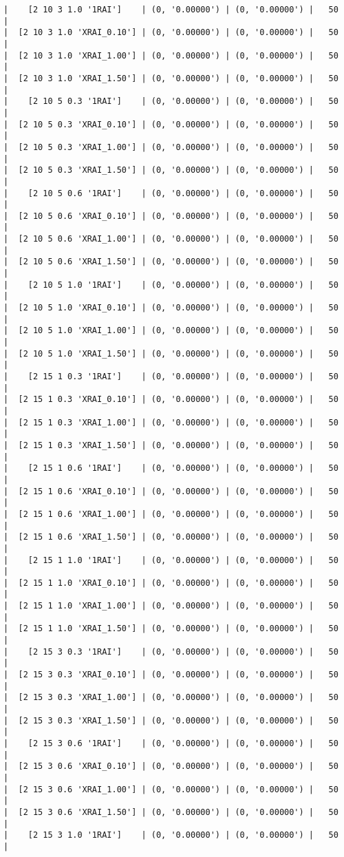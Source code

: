 \documentclass{article}
\begin{document}
\begin{verbatim}
|    [2 10 3 1.0 '1RAI']    | (0, '0.00000') | (0, '0.00000') |   50  |
|  [2 10 3 1.0 'XRAI_0.10'] | (0, '0.00000') | (0, '0.00000') |   50  |
|  [2 10 3 1.0 'XRAI_1.00'] | (0, '0.00000') | (0, '0.00000') |   50  |
|  [2 10 3 1.0 'XRAI_1.50'] | (0, '0.00000') | (0, '0.00000') |   50  |
|    [2 10 5 0.3 '1RAI']    | (0, '0.00000') | (0, '0.00000') |   50  |
|  [2 10 5 0.3 'XRAI_0.10'] | (0, '0.00000') | (0, '0.00000') |   50  |
|  [2 10 5 0.3 'XRAI_1.00'] | (0, '0.00000') | (0, '0.00000') |   50  |
|  [2 10 5 0.3 'XRAI_1.50'] | (0, '0.00000') | (0, '0.00000') |   50  |
|    [2 10 5 0.6 '1RAI']    | (0, '0.00000') | (0, '0.00000') |   50  |
|  [2 10 5 0.6 'XRAI_0.10'] | (0, '0.00000') | (0, '0.00000') |   50  |
|  [2 10 5 0.6 'XRAI_1.00'] | (0, '0.00000') | (0, '0.00000') |   50  |
|  [2 10 5 0.6 'XRAI_1.50'] | (0, '0.00000') | (0, '0.00000') |   50  |
|    [2 10 5 1.0 '1RAI']    | (0, '0.00000') | (0, '0.00000') |   50  |
|  [2 10 5 1.0 'XRAI_0.10'] | (0, '0.00000') | (0, '0.00000') |   50  |
|  [2 10 5 1.0 'XRAI_1.00'] | (0, '0.00000') | (0, '0.00000') |   50  |
|  [2 10 5 1.0 'XRAI_1.50'] | (0, '0.00000') | (0, '0.00000') |   50  |
|    [2 15 1 0.3 '1RAI']    | (0, '0.00000') | (0, '0.00000') |   50  |
|  [2 15 1 0.3 'XRAI_0.10'] | (0, '0.00000') | (0, '0.00000') |   50  |
|  [2 15 1 0.3 'XRAI_1.00'] | (0, '0.00000') | (0, '0.00000') |   50  |
|  [2 15 1 0.3 'XRAI_1.50'] | (0, '0.00000') | (0, '0.00000') |   50  |
|    [2 15 1 0.6 '1RAI']    | (0, '0.00000') | (0, '0.00000') |   50  |
|  [2 15 1 0.6 'XRAI_0.10'] | (0, '0.00000') | (0, '0.00000') |   50  |
|  [2 15 1 0.6 'XRAI_1.00'] | (0, '0.00000') | (0, '0.00000') |   50  |
|  [2 15 1 0.6 'XRAI_1.50'] | (0, '0.00000') | (0, '0.00000') |   50  |
|    [2 15 1 1.0 '1RAI']    | (0, '0.00000') | (0, '0.00000') |   50  |
|  [2 15 1 1.0 'XRAI_0.10'] | (0, '0.00000') | (0, '0.00000') |   50  |
|  [2 15 1 1.0 'XRAI_1.00'] | (0, '0.00000') | (0, '0.00000') |   50  |
|  [2 15 1 1.0 'XRAI_1.50'] | (0, '0.00000') | (0, '0.00000') |   50  |
|    [2 15 3 0.3 '1RAI']    | (0, '0.00000') | (0, '0.00000') |   50  |
|  [2 15 3 0.3 'XRAI_0.10'] | (0, '0.00000') | (0, '0.00000') |   50  |
|  [2 15 3 0.3 'XRAI_1.00'] | (0, '0.00000') | (0, '0.00000') |   50  |
|  [2 15 3 0.3 'XRAI_1.50'] | (0, '0.00000') | (0, '0.00000') |   50  |
|    [2 15 3 0.6 '1RAI']    | (0, '0.00000') | (0, '0.00000') |   50  |
|  [2 15 3 0.6 'XRAI_0.10'] | (0, '0.00000') | (0, '0.00000') |   50  |
|  [2 15 3 0.6 'XRAI_1.00'] | (0, '0.00000') | (0, '0.00000') |   50  |
|  [2 15 3 0.6 'XRAI_1.50'] | (0, '0.00000') | (0, '0.00000') |   50  |
|    [2 15 3 1.0 '1RAI']    | (0, '0.00000') | (0, '0.00000') |   50  |

\end{verbatim}
\end{document}
